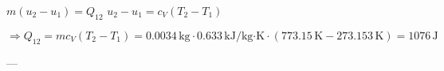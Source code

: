 \( m (u_2 - u_1) = Q_{12} \)  
\( u_2 - u_1 = c_{V} (T_2 - T_1) \)  

\( \Rightarrow Q_{12} = m c_{V} (T_2 - T_1) = 0.0034 \, \text{kg} \cdot 0.633 \, \text{kJ/kg·K} \cdot (773.15 \, \text{K} - 273.153 \, \text{K}) = 1076 \, \text{J} \)  

---